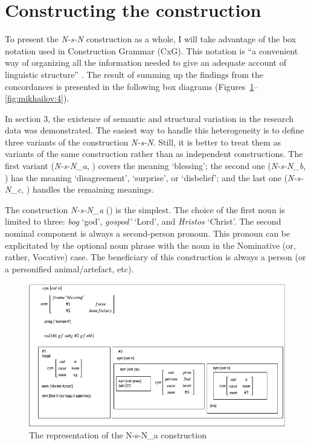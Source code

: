 \documentclass[output=paper]{langscibook}
\begin{document}
\section{Constructing the construction}

To present the \textit{N-s-N} construction as a whole, I will take advantage of the box notation used in Construction Grammar (CxG). This notation is “a convenient way of organizing all the information needed to give an adequate account of linguistic structure” \citep[13]{FriedÖstman2004}. The result of summing up the findings from the concordances is presented in the following box diagrams (Figures~\ref{fig:mikhailov:2}--\ref{fig:mikhailov:4}).

In section 3, the existence of semantic and structural variation in the research data was demonstrated. The easiest way to handle this heterogeneity is to define three variants of the construction \textit{N-s-N}. Still, it is better to treat them as variants of the same construction rather than as independent constructions. The first variant (\textit{N-s-N\_a}, ) covers the meaning ‘blessing’; the second one (\textit{N-s-N\_b}, ) has the meaning ‘disagreement’, ‘surprise’, or ‘disbelief’; and the last one (\textit{N-s-N\_c}, ) handles the remaining meanings.

The construction \textit{N-s-N\_a} () is the simplest. The choice of the first noun is limited to three: \textit{bog} ‘god’, \textit{gospod’} ‘Lord’, and \textit{Hristos} ‘Christ’. The second nominal component is always a second-person pronoun. This pronoun can be explicitated by the optional noun phrase with the noun in the Nominative (or, rather, Vocative) case. The beneficiary of this construction is always a person (or a personified animal/artefact, etc).


\begin{figure}
\includegraphics[width=\textwidth]{figures/mikhailov-img002.jpg}
\caption{\label{fig:mikhailov:2}The representation of the N-s-N\_a construction}
\end{figure}
\end{document}
